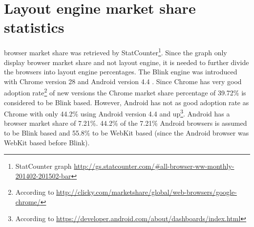 \documentclass[a4paper,11pt]{kth-mag}
\begin{document}
      \section{Layout engine market share statistics}\label{sec:layout_engines_market_share}
        \Gls{browser} market share was retrieved by \gls{StatCounter}\footnote{\gls{StatCounter} graph \url{http://gs.statcounter.com/\#all-browser-ww-monthly-201402-201502-bar}}.
        Since the graph only display \gls{browser} market share and not \gls{layout engine}, it is needed to further divide the \glspl{browser} into \gls{layout engine} percentages.
        The \gls{Blink} engine was introduced with Chrome version 28 and Android version 4.4 \cite{wiki_blink}.
        Since Chrome has very good adoption rate\footnote{According to \url{http://clicky.com/marketshare/global/web-browsers/google-chrome/}} of new versions the Chrome market share percentage of 39.72\% is considered to be \gls{Blink} based.
        However, Android has not as good adoption rate as Chrome with only 44.2\% using Android version 4.4 and up\footnote{According to \url{https://developer.android.com/about/dashboards/index.html}}.
        Android has a \gls{browser} market share of 7.21\%. 44.2\% of the 7.21\% Android \glspl{browser} is assumed to be \gls{Blink} based and 55.8\% to be \gls{WebKit} based (since the Android \gls{browser} was \gls{WebKit} based before \gls{Blink}).
\end{document}
